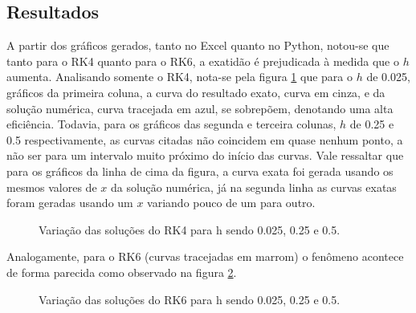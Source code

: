 \documentclass[a4paper,11pt]{article}
\begin{document}
\subsection{Resultados}

    A partir dos gráficos gerados, tanto no Excel quanto no Python, notou-se que tanto para o RK4 quanto para o RK6, a exatidão é prejudicada à medida que o $h$ aumenta. Analisando somente o RK4, nota-se pela figura \ref{RK41} que para o $h$ de 0.025, gráficos da primeira coluna, a curva do resultado exato, curva em cinza, e da solução numérica, curva tracejada em azul, se sobrepõem, denotando uma alta eficiência. Todavia, para os gráficos das segunda e terceira colunas, $h$ de 0.25 e 0.5 respectivamente, as curvas citadas não coincidem em quase nenhum ponto, a não ser para um intervalo muito próximo do início das curvas. Vale ressaltar que para os gráficos da linha de cima da figura, a curva exata foi gerada usando os mesmos valores de $x$ da solução numérica, já na segunda linha as curvas exatas foram geradas usando um $x$ variando pouco de um para outro.
    
    \begin{figure}[H]
        \centering
        \caption[width=\columnwidth]{Variação das soluções do RK4 para h sendo 0.025, 0.25 e 0.5.}
        \label{RK41}
    \end{figure}
    
    Analogamente, para o RK6 (curvas tracejadas em marrom) o fenômeno acontece de forma parecida como observado na figura \ref{RK61}.
    
    \begin{figure}[H]
        \centering
        \caption[width=\columnwidth]{Variação das soluções do RK6 para h sendo 0.025, 0.25 e 0.5.}
        \label{RK61}
    \end{figure}
    
\end{document}
